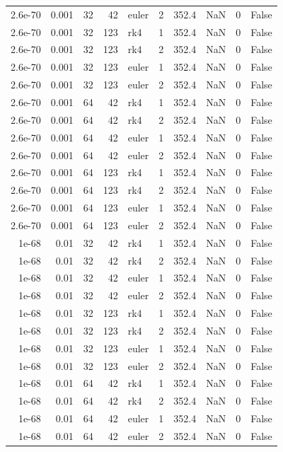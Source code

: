 \begin{tabular}{rrrrlrrrrr}
2.6e-70 & 0.001 & 32 & 42 & euler & 2 & 352.4 & NaN & 0 & False \\
2.6e-70 & 0.001 & 32 & 123 & rk4 & 1 & 352.4 & NaN & 0 & False \\
2.6e-70 & 0.001 & 32 & 123 & rk4 & 2 & 352.4 & NaN & 0 & False \\
2.6e-70 & 0.001 & 32 & 123 & euler & 1 & 352.4 & NaN & 0 & False \\
2.6e-70 & 0.001 & 32 & 123 & euler & 2 & 352.4 & NaN & 0 & False \\
2.6e-70 & 0.001 & 64 & 42 & rk4 & 1 & 352.4 & NaN & 0 & False \\
2.6e-70 & 0.001 & 64 & 42 & rk4 & 2 & 352.4 & NaN & 0 & False \\
2.6e-70 & 0.001 & 64 & 42 & euler & 1 & 352.4 & NaN & 0 & False \\
2.6e-70 & 0.001 & 64 & 42 & euler & 2 & 352.4 & NaN & 0 & False \\
2.6e-70 & 0.001 & 64 & 123 & rk4 & 1 & 352.4 & NaN & 0 & False \\
2.6e-70 & 0.001 & 64 & 123 & rk4 & 2 & 352.4 & NaN & 0 & False \\
2.6e-70 & 0.001 & 64 & 123 & euler & 1 & 352.4 & NaN & 0 & False \\
2.6e-70 & 0.001 & 64 & 123 & euler & 2 & 352.4 & NaN & 0 & False \\
1e-68 & 0.01 & 32 & 42 & rk4 & 1 & 352.4 & NaN & 0 & False \\
1e-68 & 0.01 & 32 & 42 & rk4 & 2 & 352.4 & NaN & 0 & False \\
1e-68 & 0.01 & 32 & 42 & euler & 1 & 352.4 & NaN & 0 & False \\
1e-68 & 0.01 & 32 & 42 & euler & 2 & 352.4 & NaN & 0 & False \\
1e-68 & 0.01 & 32 & 123 & rk4 & 1 & 352.4 & NaN & 0 & False \\
1e-68 & 0.01 & 32 & 123 & rk4 & 2 & 352.4 & NaN & 0 & False \\
1e-68 & 0.01 & 32 & 123 & euler & 1 & 352.4 & NaN & 0 & False \\
1e-68 & 0.01 & 32 & 123 & euler & 2 & 352.4 & NaN & 0 & False \\
1e-68 & 0.01 & 64 & 42 & rk4 & 1 & 352.4 & NaN & 0 & False \\
1e-68 & 0.01 & 64 & 42 & rk4 & 2 & 352.4 & NaN & 0 & False \\
1e-68 & 0.01 & 64 & 42 & euler & 1 & 352.4 & NaN & 0 & False \\
1e-68 & 0.01 & 64 & 42 & euler & 2 & 352.4 & NaN & 0 & False \\

\end{tabular}
